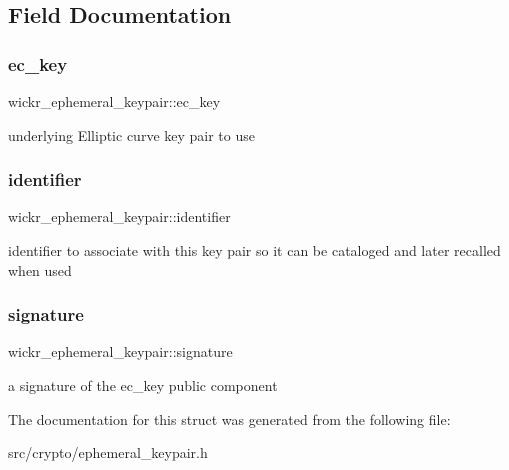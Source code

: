 \subsection{Field Documentation}
\mbox{\label{structwickr__ephemeral__keypair_ad730ed9ba92e05d0a271edc838e548fe}} 
\subsubsection{\texorpdfstring{ec\+\_\+key}{ec\_key}}
{\footnotesize\ttfamily wickr\+\_\+ephemeral\+\_\+keypair\+::ec\+\_\+key}

underlying Elliptic curve key pair to use \mbox{\label{structwickr__ephemeral__keypair_a9220b37a7db764818406bcc84e3ba86b}} 
\subsubsection{\texorpdfstring{identifier}{identifier}}
{\footnotesize\ttfamily wickr\+\_\+ephemeral\+\_\+keypair\+::identifier}

identifier to associate with this key pair so it can be cataloged and later recalled when used \mbox{\label{structwickr__ephemeral__keypair_aea420be2397d798a560fa973be86228c}} 
\subsubsection{\texorpdfstring{signature}{signature}}
{\footnotesize\ttfamily wickr\+\_\+ephemeral\+\_\+keypair\+::signature}

a signature of the \textquotesingle{}ec\+\_\+key\textquotesingle{} public component 

The documentation for this struct was generated from the following file\+:\begin{DoxyCompactItemize}
\item 
src/crypto/ephemeral\+\_\+keypair.\+h\end{DoxyCompactItemize}
